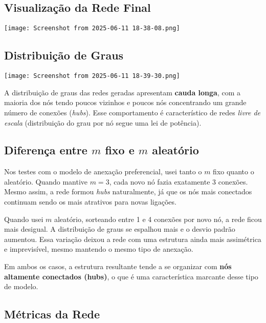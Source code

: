 \documentclass[a4paper]{article}
\begin{document}
\subsection*{Visualização da Rede Final}

\begin{center}
    \texttt{[image: Screenshot from 2025-06-11 18-38-08.png]}
\end{center}

\vspace{0.5cm}
\subsection*{Distribuição de Graus}

\begin{center}
    \texttt{[image: Screenshot from 2025-06-11 18-39-30.png]}
\end{center}

A distribuição de graus das redes geradas apresentam \textbf{cauda longa}, com a maioria dos nós tendo poucos vizinhos e poucos nós concentrando um grande número de conexões (\textit{hubs}). Esse comportamento é característico de redes \textit{livre de escala} (distribuição do grau por nó segue uma lei de potência).

\newpage

\subsection*{Diferença entre $m$ fixo e $m$ aleatório}

Nos testes com o modelo de anexação preferencial, usei tanto o $m$ fixo quanto o aleatório. Quando mantive $m = 3$, cada novo nó fazia exatamente 3 conexões. Mesmo assim, a rede formou \textit{hubs} naturalmente, já que os nós mais conectados continuam sendo os mais atrativos para novas ligações.

Quando usei $m$ aleatório, sorteando entre 1 e 4 conexões por novo nó, a rede ficou mais desigual. A distribuição de graus se espalhou mais e o desvio padrão aumentou. Essa variação deixou a rede com uma estrutura ainda mais assimétrica e imprevisível, mesmo mantendo o mesmo tipo de anexação.

Em ambos os casos, a estrutura resultante tende a se organizar com \textbf{nós altamente conectados (hubs)}, o que é uma característica marcante desse tipo de modelo.

\subsection*{Métricas da Rede}
\end{document}
